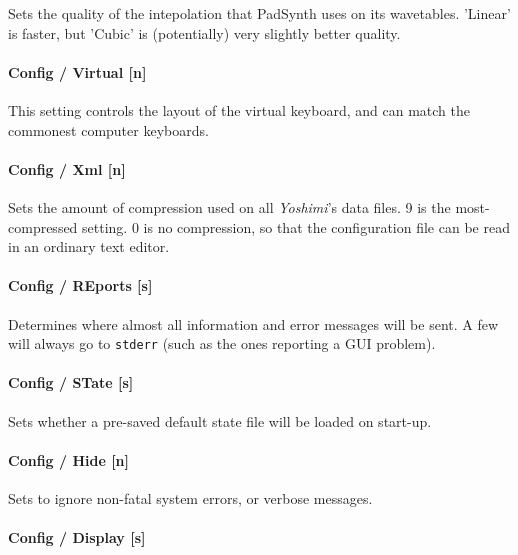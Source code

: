    Sets the quality of the intepolation that PadSynth uses on its wavetables.
   'Linear' is faster, but 'Cubic' is (potentially) very slightly better
   quality.

\paragraph{Config / Virtual [n]}
\label{paragraph:command_line_config_virtual}

   This setting controls the layout of the virtual keyboard, and can match the
   commonest computer keyboards.

\paragraph{Config / Xml [n]}
\label{paragraph:command_line_config_xml}

   Sets the amount of compression used on all
   \textsl{Yoshimi}'s data files. 9 is the most-compressed setting.
   0 is no compression, so that the configuration file
   can be read in an ordinary text editor.

\paragraph{Config / REports [s]}
\label{paragraph:command_line_config_reports}

   Determines where almost all information and error messages will be sent. A
   few will always go to \texttt{stderr} (such as the ones reporting a GUI
   problem).

\paragraph{Config / STate [s]}
\label{paragraph:command_line_config_state}

   Sets whether a pre-saved default state file will be loaded on start-up.

\paragraph{Config / Hide [n]}
\label{paragraph:command_line_config_hide}

   Sets to ignore non-fatal system errors, or verbose messages.

\paragraph{Config / Display [s]}
\label{paragraph:command_line_config_display}

